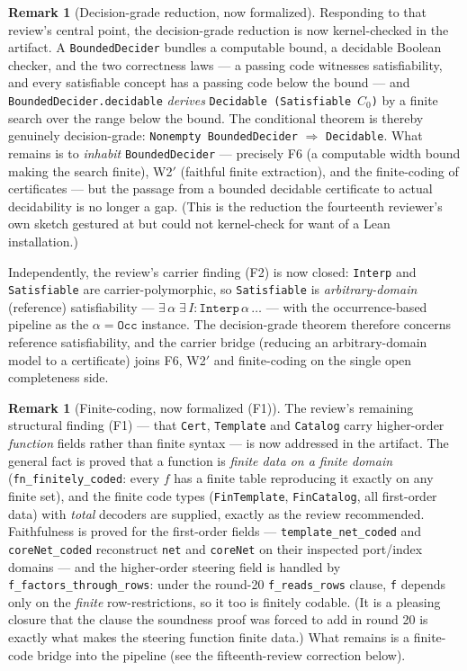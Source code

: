 \documentclass[11pt]{article}
\newcommand{\code}[1]{\texttt{#1}}
\theoremstyle{plain}
\theoremstyle{definition}
\newtheorem{remark}[theorem]{Remark}
\begin{document}
\begin{remark}[Decision-grade reduction, now formalized]
Responding to that review's central point, the decision-grade reduction
is now kernel-checked in the artifact. A \code{BoundedDecider} bundles a
computable bound, a decidable Boolean checker, and the two correctness
laws --- a passing code witnesses satisfiability, and every satisfiable
concept has a passing code below the bound --- and
\code{BoundedDecider.decidable} \emph{derives}
\code{Decidable (Satisfiable}~$C_0$\code{)} by a finite search over the
range below the bound. The conditional theorem is thereby genuinely
decision-grade: \code{Nonempty BoundedDecider} $\Rightarrow$
\code{Decidable}. What remains is to \emph{inhabit}
\code{BoundedDecider} --- precisely F6 (a computable width bound making
the search finite), W2$'$ (faithful finite extraction), and the
finite-coding of certificates --- but the passage from a bounded
decidable certificate to actual decidability is no longer a gap. (This is
the reduction the fourteenth reviewer's own sketch gestured at but could
not kernel-check for want of a Lean installation.)

Independently, the review's carrier finding (F2) is now closed:
\code{Interp} and \code{Satisfiable} are carrier-polymorphic, so
\code{Satisfiable} is \emph{arbitrary-domain} (reference) satisfiability
--- $\exists\,\alpha\;\exists\,I:\mathtt{Interp}\,\alpha\,\dots$ ---
with the occurrence-based pipeline as the $\alpha=\mathtt{Occ}$ instance.
The decision-grade theorem therefore concerns reference satisfiability,
and the carrier bridge (reducing an arbitrary-domain model to a
certificate) joins F6, W2$'$ and finite-coding on the single open
completeness side.
\end{remark}

\begin{remark}[Finite-coding, now formalized (F1)]
The review's remaining structural finding (F1) --- that \code{Cert},
\code{Template} and \code{Catalog} carry higher-order \emph{function}
fields rather than finite syntax --- is now addressed in the artifact.
The general fact is proved that a function is \emph{finite data on a
finite domain} (\code{fn\_finitely\_coded}: every $f$ has a finite
table reproducing it exactly on any finite set), and the finite code
types (\code{FinTemplate}, \code{FinCatalog}, all first-order data)
with \emph{total} decoders are supplied, exactly as the review
recommended. Faithfulness is proved for the first-order fields ---
\code{template\_net\_coded} and \code{coreNet\_coded} reconstruct
\code{net} and \code{coreNet} on their inspected port/index domains
--- and the higher-order steering field is handled by
\code{f\_factors\_through\_rows}: under the round-20
\code{f\_reads\_rows} clause, \code{f} depends only on the
\emph{finite} row-restrictions, so it too is finitely codable. (It is a
pleasing closure that the clause the soundness proof was forced to add
in round 20 is exactly what makes the steering function finite data.)
What remains is a finite-code bridge into the pipeline (see the
fifteenth-review correction below).
\end{remark}
\end{document}

